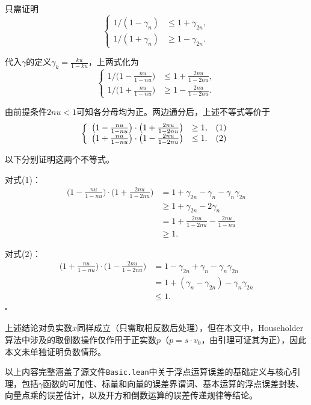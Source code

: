 ﻿\documentclass[UTF8,a4paper,openany]{ctexbook}
\theoremstyle{qrplain}
\renewenvironment{proof}[1][证明]
{\par\noindent{\qrthmchinese\bfseries #1. }\ignorespaces}
{\hfill$\square$\par}
\begin{document}
\begin{proof}
  只需证明
  $$
  \left\{
    \begin{array}{rl}
      1/(1-\gamma_n)&\le 1+\gamma_{2n},\\ 
      1/(1+\gamma_n)&\ge 1-\gamma_{2n}.
    \end{array}
  \right.
  $$

  代入$\gamma$的定义$\gamma_k = \frac{ku}{1-ku}$，上两式化为
  $$
  \left\{
    \begin{array}{rl}
      1/\bigl(1-\frac{nu}{1-nu}\bigr)&\le 1+\frac{2nu}{1-2nu},\\ 
      1/\bigl(1+\frac{nu}{1-nu}\bigr)&\ge 1-\frac{2nu}{1-2nu}.
    \end{array}
  \right.
  $$

  由前提条件$2nu<1$可知各分母均为正。两边通分后，上述不等式等价于
  $$
  \left\{
    \begin{array}{rlr}
      \bigl(1-\frac{nu}{1-nu}\bigr)\cdot\bigl(1+\frac{2nu}{1-2nu}\bigr)&\ge 1,&\hfill(1)\\
      \bigl(1+\frac{nu}{1-nu}\bigr)\cdot\bigl(1-\frac{2nu}{1-2nu}\bigr)&\le 1.&\hfill(2)
    \end{array}
  \right.
  $$

  以下分别证明这两个不等式。

  对式(1)：
  \begin{align*}
    \bigl(1-\frac{nu}{1-nu}\bigr)\cdot\bigl(1+\frac{2nu}{1-2nu}\bigr)
    &= 1+\gamma_{2n}-\gamma_n-\gamma_n\gamma_{2n} \\
    &\ge 1+\gamma_{2n}-2\gamma_n \\
    &= 1+\frac{2nu}{1-2nu}-\frac{2nu}{1-nu} \\
    &\ge 1.
  \end{align*}
  
  对式(2)：
  \begin{align*}
    \bigl(1+\frac{nu}{1-nu}\bigr)\cdot\bigl(1-\frac{2nu}{1-2nu}\bigr)
    &= 1-\gamma_{2n}+\gamma_n-\gamma_n\gamma_{2n} \\
    &= 1+(\gamma_n-\gamma_{2n})-\gamma_n\gamma_{2n} \\
    &\le 1.
  \end{align*}
\end{proof}

上述结论对负实数$x$同样成立（只需取相反数后处理），但在本文中，Householder算法中涉及的取倒数操作仅作用于正实数$p$（$p=s\cdot v_0$，由引理可证其为正），因此本文未单独证明负数情形。

以上内容完整涵盖了源文件\texttt{Basic.lean}中关于浮点运算误差的基础定义与核心引理，包括$\gamma$函数的可加性、标量和向量的误差界谓词、基本运算的浮点误差封装、向量点乘的误差估计，以及开方和倒数运算的误差传递规律等结论。
\end{document}
